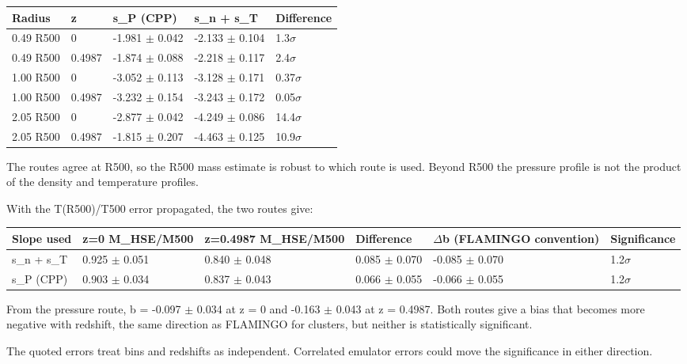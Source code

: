 \documentclass[11pt,a4paper]{article}
\begin{document}
\begin{longtable}{@{}p{}p{}p{}p{}p{}@{}}
\toprule
\textbf{Radius} & \textbf{z} & \textbf{s\_P (CPP)} & \textbf{s\_n + s\_T} & \textbf{Difference} \\ \midrule \endhead
0.49 R500 & 0 & -1.981 $\pm$ 0.042 & -2.133 $\pm$ 0.104 & 1.3$\sigma$ \\
0.49 R500 & 0.4987 & -1.874 $\pm$ 0.088 & -2.218 $\pm$ 0.117 & 2.4$\sigma$ \\
1.00 R500 & 0 & -3.052 $\pm$ 0.113 & -3.128 $\pm$ 0.171 & 0.37$\sigma$ \\
1.00 R500 & 0.4987 & -3.232 $\pm$ 0.154 & -3.243 $\pm$ 0.172 & 0.05$\sigma$ \\
2.05 R500 & 0 & -2.877 $\pm$ 0.042 & -4.249 $\pm$ 0.086 & 14.4$\sigma$ \\
2.05 R500 & 0.4987 & -1.815 $\pm$ 0.207 & -4.463 $\pm$ 0.125 & 10.9$\sigma$ \\
\bottomrule\end{longtable}
The routes agree at R500, so the R500 mass estimate is robust to which route is used. Beyond R500 the pressure profile is not the product of the density and temperature profiles.

With the T(R500)/T500 error propagated, the two routes give:

\begin{longtable}{@{}p{}p{}p{}p{}p{}p{}@{}}
\toprule
\textbf{Slope used} & \textbf{z=0 M\_HSE/M500} & \textbf{z=0.4987 M\_HSE/M500} & \textbf{Difference} & \textbf{$\Delta$b (FLAMINGO convention)} & \textbf{Significance} \\ \midrule \endhead
s\_n + s\_T & 0.925 $\pm$ 0.051 & 0.840 $\pm$ 0.048 & 0.085 $\pm$ 0.070 & -0.085 $\pm$ 0.070 & 1.2$\sigma$ \\
s\_P (CPP) & 0.903 $\pm$ 0.034 & 0.837 $\pm$ 0.043 & 0.066 $\pm$ 0.055 & -0.066 $\pm$ 0.055 & 1.2$\sigma$ \\
\bottomrule\end{longtable}
From the pressure route, b = -0.097 $\pm$ 0.034 at z = 0 and -0.163 $\pm$ 0.043 at z = 0.4987. Both routes give a bias that becomes more negative with redshift, the same direction as FLAMINGO for clusters, but neither is statistically significant.

The quoted errors treat bins and redshifts as independent. Correlated emulator errors could move the significance in either direction.
\end{document}

